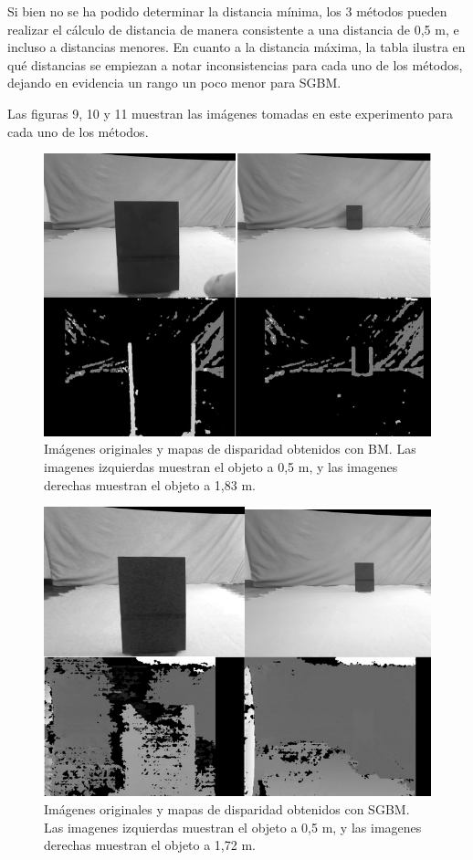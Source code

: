 \documentclass[11pt,a4paper,titlepage]{article}
\begin{document}
Si bien no se ha podido determinar la distancia mínima, los 3 métodos pueden realizar el cálculo de distancia de manera consistente a una distancia de 0,5 m, e incluso a distancias menores. En cuanto a la distancia máxima, la tabla ilustra en qué distancias se empiezan a notar inconsistencias para cada uno de los métodos, dejando en evidencia un rango un poco menor para SGBM.

Las figuras 9, 10 y 11 muestran las imágenes tomadas en este experimento para cada uno de los métodos.

\begin{figure}[h!]

  \centering
    \includegraphics[width=1\textwidth]{f8.png}
  \caption{Imágenes originales y mapas de disparidad obtenidos con BM. Las imagenes izquierdas muestran el objeto a 0,5 m, y las imagenes derechas muestran el objeto a 1,83 m.}
\end{figure}

\begin{figure}[h!]

  \centering
    \includegraphics[width=1\textwidth]{f9.png}
  \caption{Imágenes originales y mapas de disparidad obtenidos con SGBM. Las imagenes izquierdas muestran el objeto a 0,5 m, y las imagenes derechas muestran el objeto a 1,72 m.}
\end{figure}
\end{document}
